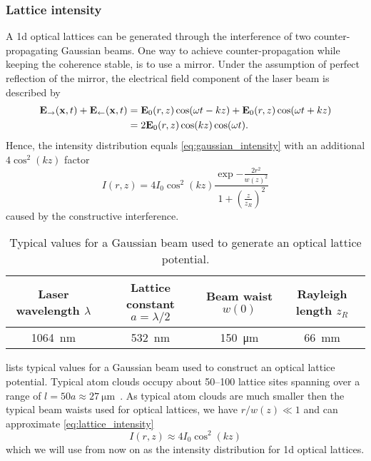 \subsubsection{Lattice intensity}

A \gls{1d} optical lattices can be generated through the interference
of two counter-propagating Gaussian beams. One way to achieve
counter-propagation while keeping the coherence stable, is to use a mirror.
Under the assumption of perfect reflection of the mirror, the electrical field
component of the laser beam is described by
\begin{align*}
  \vb{E}_\rightarrow(\vb{x},t)+\vb{E}_\leftarrow(\vb{x},t)
  &=
  \vb{E}_0(r,z)\cos(\omega t-kz)+\vb{E}_0(r,z)\cos(\omega t+kz)\\
  &=
  2\vb{E}_0(r,z)\cos(kz)\cos(\omega t).
\end{align*}
Hence, the intensity distribution equals
\cref{eq:gaussian_intensity} with an additional $4\cos^2(kz)$ factor
\begin{equation}
  I(r,z)
  =
  4I_0\cos^2(kz)
  \frac{\exp{-\frac{2r^2}{w{(z)}^2}}}{1+{\left(\frac{z}{z_R}\right)}^2}
  \label{eq:lattice_intensity}
\end{equation}
caused by the constructive interference.
\begin{table}[ht]
  \centering
  \begin{tabular}{cccc}
    \toprule
    Laser wavelength $\lambda$ &
    Lattice constant $a=\lambda/2$ &
    Beam waist $w(0)$ &
    Rayleigh length $z_R$ \\
    \midrule
    \SI{1064}{\nano\meter} &
    \SI{532}{\nano\meter} &
    \SI{150}{\micro\meter} &
    \SI{66}{\milli\meter} \\
    \bottomrule
  \end{tabular}
  \captionsetup{width=.8\textwidth}
  \caption{Typical values for a Gaussian beam used to generate an optical
    lattice potential.
  }\label{tab:gaussian_beam_lattice}
\end{table}
 lists typical values for a Gaussian beam
used to construct an optical lattice potential. Typical atom clouds occupy
about 50--100 lattice sites spanning over a range of
$l=50a\approx\SI{27}{\micro\meter}$~\cite{Rom2009}. As typical atom clouds
are much smaller then the typical beam waists used for optical lattices, we
have $r/w(z)\ll1$ and can approximate \cref{eq:lattice_intensity}
\begin{equation}
  I(r,z)
  \approx
  4I_0\cos^2(kz)
  \label{eq:gaussian_intensity_approx}
\end{equation}
which we will use from now on as the intensity distribution for \gls{1d}
optical lattices.

